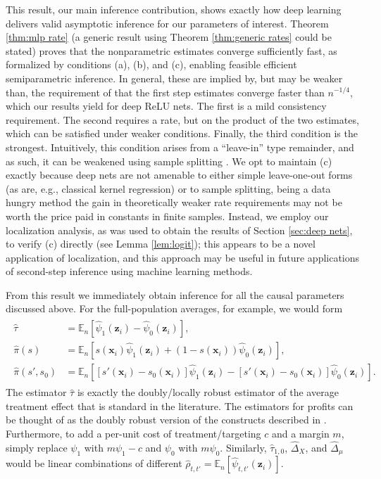 \documentclass[11pt]{article}
\numberwithin{equation}{section}
\theoremstyle{definition}
\newcommand{\E}{\mathbb{E}}
\newcommand{\bz}{\bm{z}}
\newcommand{\bx}{\bm{x}}
\begin{document}
This result, our main inference contribution, shows exactly how deep learning delivers valid asymptotic inference for our parameters of interest. Theorem \ref{thm:mlp rate} (a generic result using Theorem \ref{thm:generic rates} could be stated) proves that the nonparametric estimates converge sufficiently fast, as formalized by conditions (a), (b), and (c), enabling feasible efficient semiparametric inference. In general, these are implied by, but may be weaker than, the requirement of that the first step estimates converge faster than $n^{-1/4}$, which our results yield for deep ReLU nets. The first is a mild consistency requirement. The second requires a rate, but on the product of the two estimates, which can be satisfied under weaker conditions. Finally, the third condition is the strongest. Intuitively, this condition arises from a ``leave-in'' type remainder, and as such, it can be weakened using sample splitting \cite{Chernozhukov-etal2018_EJ,Newey-Robins2018_WP}. We opt to maintain (c) exactly because deep nets are not amenable to either simple leave-one-out forms (as are, e.g., classical kernel regression) or to sample splitting, being a data hungry method the gain in theoretically weaker rate requirements may not be worth the price paid in constants in finite samples. Instead, we employ our localization analysis, as was used to obtain the results of Section \ref{sec:deep nets}, to verify (c) directly (see Lemma \ref{lem:logit}); this appears to be a novel application of localization, and this approach may be useful in future applications of second-step inference using machine learning methods.



From this result we immediately obtain inference for all the causal parameters discussed above. For the full-population averages, for example, we would form
\begin{align}
	\begin{split}
		\label{eqn:dr}
		\hat{\tau} & = \E_n \left[ \hat{\psi}_1(\bz_i) - \hat{\psi}_0(\bz_i) \right],   			\\
		\hat{\pi}(s) & = \E_n \left[ s(\bx_i)\hat{\psi}_1(\bz_i)  + (1-s(\bx_i))\hat{\psi}_0(\bz_i) \right],   			\\
		\hat{\pi}(s', s_0) & = \E_n \left[ [s'(\bx_i) - s_0(\bx_i)] \hat{\psi}_1(\bz_i) - [s'(\bx_i) - s_0(\bx_i)] \hat{\psi}_0(\bz_i) \right].
	\end{split}
\end{align}
The estimator $\hat{\tau}$ is exactly the doubly/locally robust estimator of the average treatment effect that is standard in the literature. The estimators for profits can be thought of as the doubly robust version of the constructs described in \cite{Hitsch-Misra2018_WP}. Furthermore, to add a per-unit cost of treatment/targeting $c$ and a margin $m$, simply replace $\psi_1$ with $m \psi_1 - c$ and $\psi_0$ with $m \psi_0$. Similarly, $\hat{\tau}_{1,0}$, $\hat{\Delta}_X$, and $\hat{\Delta}_\mu$ would be linear combinations of different $\hat{\rho}_{t,t'} = \E_n [ \hat{\psi}_{t,t'}(\bz_i) ]$.
\end{document}
